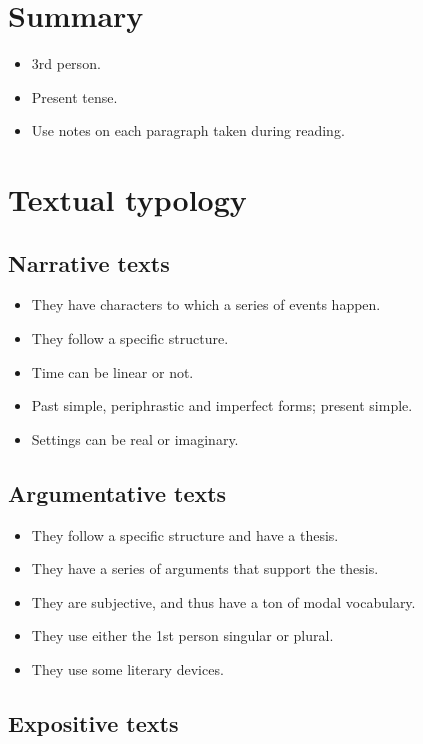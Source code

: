 \documentclass{article}
\begin{document}
\section*{Summary}

\begin{itemize}
    \item 3rd person.
    \item Present tense.
    \item Use notes on each paragraph taken during reading.
\end{itemize}

\section*{Textual typology}

\subsection*{Narrative texts}

\begin{itemize}
    \item They have characters to which a series of events happen.
    \item They follow a specific structure.
    \item Time can be linear or not.
    \item Past simple, periphrastic and imperfect forms; present simple.
    \item Settings can be real or imaginary.
\end{itemize}

\subsection*{Argumentative texts}

\begin{itemize}
    \item They follow a specific structure and have a thesis.
    \item They have a series of arguments that support the thesis.
    \item They are subjective, and thus have a ton of modal vocabulary.
    \item They use either the 1st person singular or plural.
    \item They use some literary devices.
\end{itemize}

\subsection*{Expositive texts}
\end{document}
